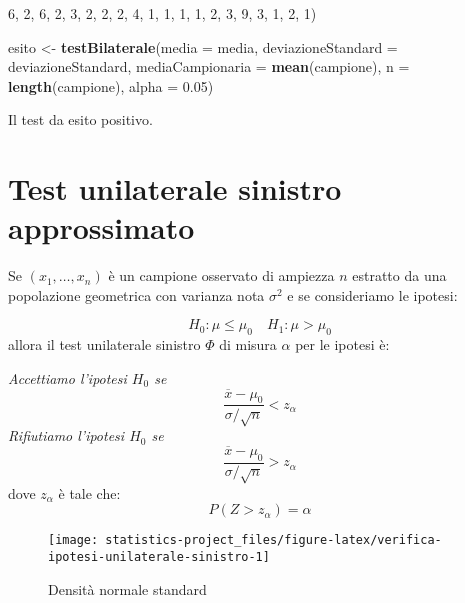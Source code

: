 \documentclass[]{book}
\newenvironment{Shaded}{\begin{snugshade}}{\end{snugshade}}
\newcommand{\KeywordTok}[1]{\textcolor[rgb]{0.13,0.29,0.53}{\textbf{#1}}}
\newcommand{\DataTypeTok}[1]{\textcolor[rgb]{0.13,0.29,0.53}{#1}}
\newcommand{\DecValTok}[1]{\textcolor[rgb]{0.00,0.00,0.81}{#1}}
\newcommand{\FloatTok}[1]{\textcolor[rgb]{0.00,0.00,0.81}{#1}}
\newcommand{\StringTok}[1]{\textcolor[rgb]{0.31,0.60,0.02}{#1}}
\newcommand{\NormalTok}[1]{#1}
\begin{document}
\begin{Shaded}
\begin{Highlighting}[]
              \DecValTok{6}\NormalTok{, }\DecValTok{2}\NormalTok{, }\DecValTok{6}\NormalTok{, }\DecValTok{2}\NormalTok{, }\DecValTok{3}\NormalTok{, }\DecValTok{2}\NormalTok{, }\DecValTok{2}\NormalTok{, }\DecValTok{2}\NormalTok{, }\DecValTok{4}\NormalTok{, }\DecValTok{1}\NormalTok{, }\DecValTok{1}\NormalTok{, }\DecValTok{1}\NormalTok{, }\DecValTok{1}\NormalTok{, }\DecValTok{2}\NormalTok{, }\DecValTok{3}\NormalTok{, }\DecValTok{9}\NormalTok{, }\DecValTok{3}\NormalTok{, }\DecValTok{1}\NormalTok{, }\DecValTok{2}\NormalTok{, }\DecValTok{1}\NormalTok{)}

\NormalTok{esito <-}\StringTok{ }\KeywordTok{testBilaterale}\NormalTok{(}\DataTypeTok{media =}\NormalTok{ media, }
                        \DataTypeTok{deviazioneStandard =}\NormalTok{ deviazioneStandard, }
                        \DataTypeTok{mediaCampionaria =} \KeywordTok{mean}\NormalTok{(campione), }
                        \DataTypeTok{n =} \KeywordTok{length}\NormalTok{(campione), }
                        \DataTypeTok{alpha =} \FloatTok{0.05}\NormalTok{)}
\end{Highlighting}
\end{Shaded}

Il test da esito positivo.

\section{Test unilaterale sinistro
approssimato}\label{test-unilaterale-sinistro-approssimato}

Se \((x_1,\dots,x_n)\) è un campione osservato di ampiezza \(n\)
estratto da una popolazione geometrica con varianza nota \(\sigma^2\) e
se consideriamo le ipotesi:

\[H_0 : \mu \le \mu_0 \quad H_1 : \mu > \mu_0\] allora il test
unilaterale sinistro \(\Phi\) di misura \(\alpha\) per le ipotesi è:

\emph{Accettiamo l'ipotesi \(H_0\) se}
\[\frac{\overline x - \mu_0}{\sigma / \sqrt{n}} < z_{\alpha}\]
\emph{Rifiutiamo l'ipotesi \(H_0\) se}
\[\frac{\overline x - \mu_0}{\sigma / \sqrt{n}} > z_{\alpha}\] dove
\(z_{\alpha}\) è tale che: \[P(Z > z_{\alpha}) = \alpha\]

\begin{figure}

{\centering \texttt{[image: statistics-project\_files/figure-latex/verifica-ipotesi-unilaterale-sinistro-1]} 

}

\caption{Densità normale standard}\label{fig:verifica-ipotesi-unilaterale-sinistro}
\end{figure}
\end{document}
